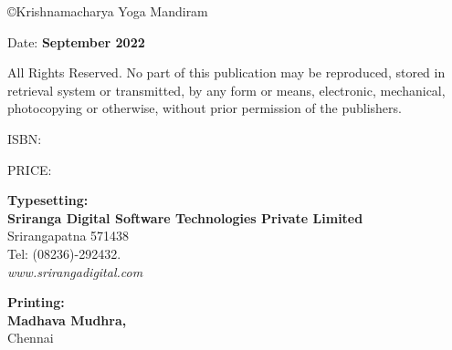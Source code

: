 \thispagestyle{empty}

{\small\copyright{Krishnamacharya Yoga Mandiram}}
\bigskip

Date: \textbf{September 2022}
\vfill

{\small
All Rights Reserved. No part of this publication may be reproduced, stored in retrieval system or 
transmitted, by any form or means, electronic, mechanical, photocopying or otherwise, without 
prior permission of the publishers.}
\vspace{1cm}

ISBN: 
\bigskip

PRICE:
\vfill

\textbf{Typesetting:}\\[4pt] 
\textbf{Sriranga Digital Software Technologies Private Limited}\\ 
Srirangapatna 571438\\ 
Tel: (08236)-292432.\\ 
\textit{www.srirangadigital.com}
\vfill

\textbf{Printing:}\\ [4pt] 
\textbf{Madhava Mudhra,}\\ 
Chennai

